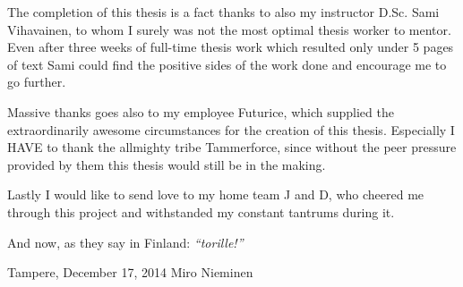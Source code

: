 The completion of this thesis is a fact thanks to also my instructor D.Sc. Sami Vihavainen, to whom I surely was not the most optimal thesis worker to mentor. Even after three weeks of full-time thesis work which resulted only under 5 pages of text Sami could find the positive sides of the work done and encourage me to go further.

Massive thanks goes also to my employee Futurice, which supplied the extraordinarily awesome circumstances for the creation of this thesis. Especially I HAVE to thank the allmighty tribe Tammerforce, since without the peer pressure provided by them this thesis would still be in the making. 

Lastly I would like to send love to my home team J and D, who cheered me through this project and withstanded my constant tantrums during it.

And now, as they say in Finland: \textit{``torille!''}


\bigskip

\noindent 
Tampere, December 17, 2014
\noindent 
Miro Nieminen







\newpage
\tableofcontents










\newpage
\renewcommand{\chaptermark}[1]{\markboth{\thechapter. \ #1}{}}
\renewcommand{\sectionmark}[1]{\markright{}{}}
\lhead{\fancyplain{}{\leftmark}}
 

